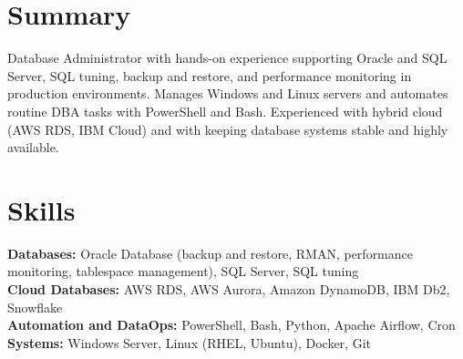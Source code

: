 \documentclass[a4paper,10pt]{article}
\begin{document}

\section*{Summary}
Database Administrator with hands-on experience supporting Oracle and SQL Server, SQL tuning, backup and restore, and performance monitoring in production environments. Manages Windows and Linux servers and automates routine DBA tasks with PowerShell and Bash. Experienced with hybrid cloud (AWS RDS, IBM Cloud) and with keeping database systems stable and highly available.

\section*{Skills}
\textbf{Databases:} Oracle Database (backup and restore, RMAN, performance monitoring, tablespace management), SQL Server, SQL tuning\\
\textbf{Cloud Databases:} AWS RDS, AWS Aurora, Amazon DynamoDB, IBM Db2, Snowflake\\
\textbf{Automation and DataOps:} PowerShell, Bash, Python, Apache Airflow, Cron\\
\textbf{Systems:} Windows Server, Linux (RHEL, Ubuntu), Docker, Git
\end{document}
